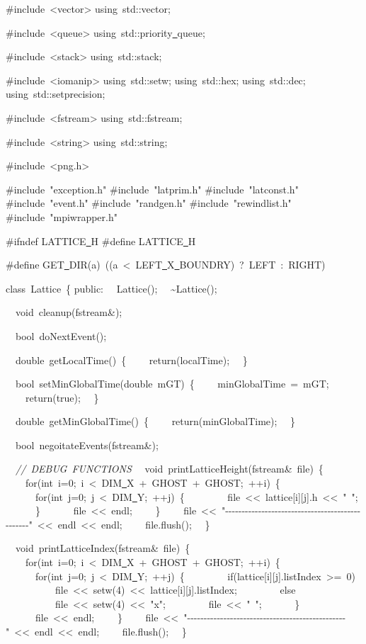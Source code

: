 {\ttfamily \raggedright \footnotesize
\#include\ <{}vector>{}
using\ std::vector;

\#include\ <{}queue>{}
using\ std::priority\underline\ queue;

\#include\ <{}stack>{}
using\ std::stack;

\#include\ <{}iomanip>{}
using\ std::setw;
using\ std::hex;
using\ std::dec;
using\ std::setprecision;

\#include\ <{}fstream>{}
using\ std::fstream;

\#include\ <{}string>{}
using\ std::string;

\#include\ <{}png.h>{}

\#include\ "{}exception.h"{}
\#include\ "{}latprim.h"{}
\#include\ "{}latconst.h"{}
\#include\ "{}event.h"{}
\#include\ "{}randgen.h"{}
\#include\ "{}rewindlist.h"{}
\#include\ "{}mpiwrapper.h"{}

\#ifndef LATTICE\underline\ H
\#define LATTICE\underline\ H

\#define GET\underline\ DIR(a)\ ((a\ <{}\ LEFT\underline\ X\underline\ BOUNDRY)\ ?\ LEFT\ :\ RIGHT)

class\ Lattice\ \{
public:
\ \ Lattice();
\ \ \textasciitilde Lattice();

\ \ void\ cleanup(fstream\&);

\ \ bool\ doNextEvent();

\ \ double\ getLocalTime()\ \{
\ \ \ \ return(localTime);
\ \ \}

\ \ bool\ setMinGlobalTime(double\ mGT)\ \{
\ \ \ \ minGlobalTime\ =\ mGT;
\ \ \ \ return(true);
\ \ \}

\ \ double\ getMinGlobalTime()\ \{
\ \ \ \ return(minGlobalTime);
\ \ \}

\ \ bool\ negoitateEvents(fstream\&);

\ \ \textsl{//\ DEBUG\ FUNCTIONS}
\ \ void\ printLatticeHeight(fstream\&\ file)\ \{
\ \ \ \ for(int\ i=0;\ i\ <{}\ DIM\underline\ X\ +\ GHOST\ +\ GHOST;\ ++i)\ \{
\ \ \ \ \ \ for(int\ j=0;\ j\ <{}\ DIM\underline\ Y;\ ++j)\ \{
\ \ \ \ \ \ \ \ file\ <{}<{}\ lattice[i][j].h\ <{}<{}\ "{}\ "{};
\ \ \ \ \ \ \}
\ \ \ \ \ \ file\ <{}<{}\ endl;
\ \ \ \ \}
\ \ \ \ file\ <{}<{}\ "{}-{}-{}-{}-{}-{}-{}-{}-{}-{}-{}-{}-{}-{}-{}-{}-{}-{}-{}-{}-{}-{}-{}-{}-{}-{}-{}-{}-{}-{}-{}-{}-{}-{}-{}-{}-{}-{}-{}-{}-{}-{}-{}-{}-{}-{}-{}-{}-{}"{}\ <{}<{}\ endl\ <{}<{}\ endl;
\ \ \ \ file.flush();
\ \ \}

\ \ void\ printLatticeIndex(fstream\&\ file)\ \{
\ \ \ \ for(int\ i=0;\ i\ <{}\ DIM\underline\ X\ +\ GHOST\ +\ GHOST;\ ++i)\ \{
\ \ \ \ \ \ for(int\ j=0;\ j\ <{}\ DIM\underline\ Y;\ ++j)\ \{
\ \ \ \ \ \ \ \ if(lattice[i][j].listIndex\ >{}=\ 0)
\ \ \ \ \ \ \ \ \ \ file\ <{}<{}\ setw(4)\ <{}<{}\ lattice[i][j].listIndex;
\ \ \ \ \ \ \ \ else
\ \ \ \ \ \ \ \ \ \ file\ <{}<{}\ setw(4)\ <{}<{}\ "{}x"{};
\ \ \ \ \ \ \ \ file\ <{}<{}\ "{}\ "{};
\ \ \ \ \ \ \}
\ \ \ \ \ \ file\ <{}<{}\ endl;
\ \ \ \ \}
\ \ \ \ file\ <{}<{}\ "{}-{}-{}-{}-{}-{}-{}-{}-{}-{}-{}-{}-{}-{}-{}-{}-{}-{}-{}-{}-{}-{}-{}-{}-{}-{}-{}-{}-{}-{}-{}-{}-{}-{}-{}-{}-{}-{}-{}-{}-{}-{}-{}-{}-{}-{}-{}-{}-{}"{}\ <{}<{}\ endl\ <{}<{}\ endl;
\ \ \ \ file.flush();
\ \ \}

}
